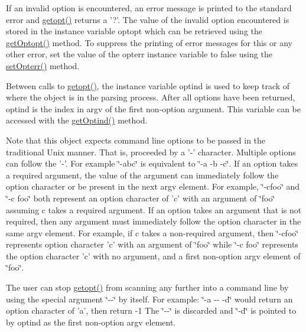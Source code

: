 If an invalid option is encountered, an error message is printed to the standard error and \hyperlink{classgnu_1_1getopt_1_1_getopt_a49e6fc6e18756f5dfaf85c1067325c3b}{getopt()} returns a '?'. The value of the invalid option encountered is stored in the instance variable optopt which can be retrieved using the \hyperlink{classgnu_1_1getopt_1_1_getopt_ad33843ab06130ce60d60556241d1dc99}{getOptopt()} method. To suppress the printing of error messages for this or any other error, set the value of the opterr instance variable to false using the \hyperlink{classgnu_1_1getopt_1_1_getopt_aa132089015be3665ca422f3eae3d0a38}{setOpterr()} method. 

Between calls to \hyperlink{classgnu_1_1getopt_1_1_getopt_a49e6fc6e18756f5dfaf85c1067325c3b}{getopt()}, the instance variable optind is used to keep track of where the object is in the parsing process. After all options have been returned, optind is the index in argv of the first non-\/option argument. This variable can be accessed with the \hyperlink{classgnu_1_1getopt_1_1_getopt_af9f1a42a320e2112325fd5ea41504bdf}{getOptind()} method. 

Note that this object expects command line options to be passed in the traditional Unix manner. That is, proceeded by a '-\/' character. Multiple options can follow the '-\/'. For example \char`\"{}-\/abc\char`\"{} is equivalent to \char`\"{}-\/a -\/b -\/c\char`\"{}. If an option takes a required argument, the value of the argument can immediately follow the option character or be present in the next argv element. For example, \char`\"{}-\/cfoo\char`\"{} and \char`\"{}-\/c foo\char`\"{} both represent an option character of 'c' with an argument of \char`\"{}foo\char`\"{} assuming c takes a required argument. If an option takes an argument that is not required, then any argument must immediately follow the option character in the same argv element. For example, if c takes a non-\/required argument, then \char`\"{}-\/cfoo\char`\"{} represents option character 'c' with an argument of \char`\"{}foo\char`\"{} while \char`\"{}-\/c foo\char`\"{} represents the option character 'c' with no argument, and a first non-\/option argv element of \char`\"{}foo\char`\"{}. 

The user can stop \hyperlink{classgnu_1_1getopt_1_1_getopt_a49e6fc6e18756f5dfaf85c1067325c3b}{getopt()} from scanning any further into a command line by using the special argument \char`\"{}-\/-\/\char`\"{} by itself. For example: \char`\"{}-\/a -\/-\/ -\/d\char`\"{} would return an option character of 'a', then return -\/1 The \char`\"{}-\/-\/\char`\"{} is discarded and \char`\"{}-\/d\char`\"{} is pointed to by optind as the first non-\/option argv element. 

